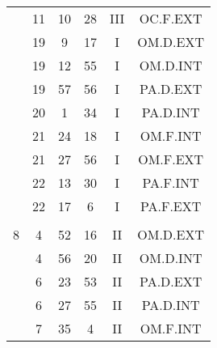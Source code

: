 \documentclass[12pt, a4paper]{article}
\begin{document}
\begin{multicols}{3}
{\begin{tabular}{c c c c c c}
	 	 	 	 & 11 & 10 & 28 & III & OC.F.EXT\\%
	 	 	 	 & 19 & 9 & 17 & I & OM.D.EXT\\%
	 	 	 	 & 19 & 12 & 55 & I & OM.D.INT\\%
	 	 	 	 & 19 & 57 & 56 & I & PA.D.EXT\\%
	 	 	 	 & 20 & 1 & 34 & I & PA.D.INT\\%
	 	 	 	 & 21 & 24 & 18 & I & OM.F.INT\\%
	 	 	 	 & 21 & 27 & 56 & I & OM.F.EXT\\%
	 	 	 	 & 22 & 13 & 30 & I & PA.F.INT\\%
	 	 	 	 & 22 & 17 & 6 & I & PA.F.EXT\\%
	 	 	 	 & & & & & \\%
	 	 	 	8 & 4 & 52 & 16 & II & OM.D.EXT\\%
	 	 	 	 & 4 & 56 & 20 & II & OM.D.INT\\%
	 	 	 	 & 6 & 23 & 53 & II & PA.D.EXT\\%
	 	 	 	 & 6 & 27 & 55 & II & PA.D.INT\\%
	 	 	 	 & 7 & 35 & 4 & II & OM.F.INT\\%
	 	 \end{tabular}
 	}
\end{multicols}
\end{document}
